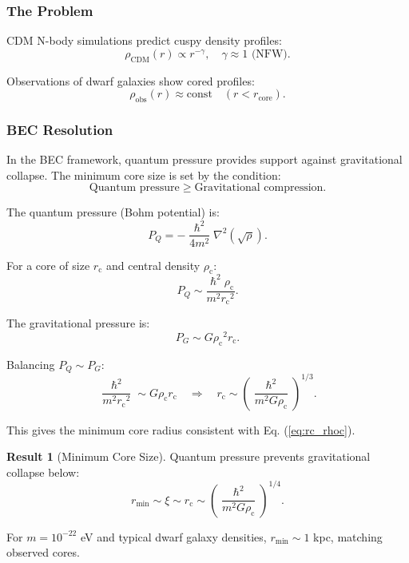 \documentclass[11pt,a4paper]{article}
\newcommand{\hbar}{\ensuremath{\hslash}}
\newcommand{\rc}{\ensuremath{r_{\mathrm{c}}}}
\newcommand{\rhoc}{\ensuremath{\rho_{\mathrm{c}}}}
\theoremstyle{definition}
\newtheorem{result}{Result}
\theoremstyle{remark}
\begin{document}
\subsubsection{The Problem}

CDM N-body simulations predict cuspy density profiles:
\begin{equation}
\rho_{\mathrm{CDM}}(r) \propto r^{-\gamma}, \quad \gamma \approx 1 \text{ (NFW)}.
\end{equation}

Observations of dwarf galaxies show cored profiles:
\begin{equation}
\rho_{\mathrm{obs}}(r) \approx \text{const} \quad (r < r_{\mathrm{core}}).
\end{equation}

\subsubsection{BEC Resolution}

In the BEC framework, quantum pressure provides support against gravitational collapse. The minimum core size is set by the condition:
\begin{equation}
\text{Quantum pressure} \geq \text{Gravitational compression}.
\end{equation}

The quantum pressure (Bohm potential) is:
\begin{equation}
P_Q = -\frac{\hbar^2}{4m^2}\nabla^2(\sqrt{\rho}).
\end{equation}

For a core of size $\rc$ and central density $\rhoc$:
\begin{equation}
P_Q \sim \frac{\hbar^2 \rhoc}{m^2 \rc^2}.
\end{equation}

The gravitational pressure is:
\begin{equation}
P_G \sim G\rhoc^2 \rc.
\end{equation}

Balancing $P_Q \sim P_G$:
\begin{equation}
\frac{\hbar^2}{m^2\rc^2} \sim G\rhoc\rc \quad \Rightarrow \quad \rc \sim \left(\frac{\hbar^2}{m^2 G\rhoc}\right)^{1/3}.
\end{equation}

This gives the minimum core radius consistent with Eq. (\ref{eq:rc_rhoc}).

\begin{result}[Minimum Core Size]
Quantum pressure prevents gravitational collapse below:
\begin{equation}
\boxed{r_{\min} \sim \xi \sim \rc \sim \left(\frac{\hbar^2}{m^2 G\rhoc}\right)^{1/4}.}
\end{equation}

For $m = 10^{-22}$ eV and typical dwarf galaxy densities, $r_{\min} \sim 1$ kpc, matching observed cores.
\end{result}
\end{document}
